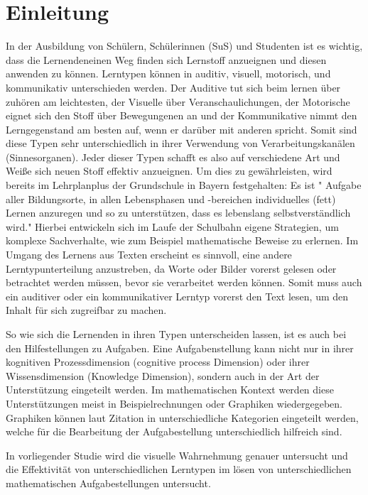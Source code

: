 \chapter{Einleitung}

In der Ausbildung von Schülern, Schülerinnen (SuS) und Studenten ist es wichtig, dass die Lernendeneinen Weg finden sich Lernstoff anzueignen und diesen anwenden zu können. Lerntypen können in auditiv, visuell, motorisch, und kommunikativ unterschieden werden. Der Auditive tut sich beim lernen über zuhören am leichtesten, der Visuelle über Veranschaulichungen, der Motorische eignet sich den Stoff über Bewegungenen an und der Kommunikative nimmt den Lerngegenstand am besten auf, wenn er darüber mit anderen spricht.  Somit sind diese Typen sehr unterschiedlich in ihrer Verwendung von Verarbeitungskanälen (Sinnesorganen).
Jeder dieser Typen schafft es also auf verschiedene Art und Weiße sich neuen Stoff effektiv anzueignen.
Um dies zu gewährleisten, wird bereits im Lehrplanplus der Grundschule in Bayern festgehalten:
Es ist " Aufgabe aller Bildungsorte, in allen Lebensphasen und -bereichen individuelles (fett)
 Lernen anzuregen und so zu unterstützen, dass es lebenslang selbstverständlich wird."
Hierbei entwickeln sich im Laufe der Schulbahn eigene Strategien, um komplexe Sachverhalte,
wie zum Beispiel mathematische Beweise zu erlernen. 
Im Umgang des Lernens aus Texten erscheint es sinnvoll, eine andere Lerntypunterteilung anzustreben, da Worte oder Bilder vorerst gelesen oder betrachtet werden müssen, bevor sie verarbeitet werden können. Somit muss auch ein auditiver oder ein kommunikativer Lerntyp vorerst den Text lesen, um den Inhalt für sich zugreifbar zu machen. 

So wie sich die Lernenden in ihren Typen unterscheiden lassen, ist es auch bei den Hilfestellungen zu Aufgaben. Eine Aufgabenstellung kann nicht nur in ihrer kognitiven Prozessdimension (cognitive process Dimension) oder ihrer Wissensdimension (Knowledge Dimension), sondern auch in der Art der Unterstützung eingeteilt werden. Im mathematischen Kontext werden diese Unterstützungen meist in Beispielrechnungen oder Graphiken wiedergegeben. Graphiken können laut Zitation in unterschiedliche Kategorien eingeteilt werden, welche für die Bearbeitung der Aufgabestellung unterschiedlich hilfreich sind. %

In vorliegender Studie wird die visuelle Wahrnehmung genauer untersucht und die Effektivität von unterschiedlichen Lerntypen im lösen von unterschiedlichen mathematischen Aufgabestellungen untersucht. 